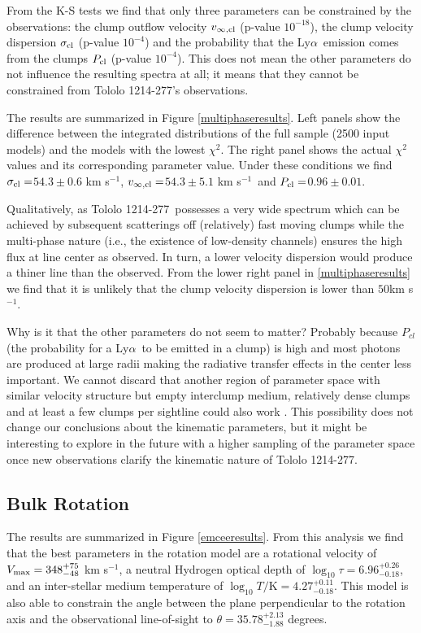 \documentclass[a4,useAMS,usenatbib,usegraphicx]{mn2e}
\newcommand{\tol}{Tololo 1214-277}
\newcommand{\lya}{Ly$\alpha$}
\newcommand{\kms}{km s$^{-1}$}
\newcommand{\sigmaclump}{$54.3\pm 0.6$ km s$^{-1}$}
\newcommand{\inftyclump}{$54.3\pm 5.1$ km s$^{-1}$}
\newcommand{\probaclump}{$0.96\pm 0.01$}
\begin{document}
From the K-S tests we find that only three parameters can be
constrained by the observations: the clump outflow velocity
$v_{\infty,\rm{cl}}$ (p-value  $10^{-18}$), the clump velocity
dispersion $\sigma_{\rm cl}$ (p-value $10^{-4}$) and the probability
that the \lya\ emission comes from the clumps $P_{\rm cl}$ (p-value
$10^{-4}$).
This does not mean the other parameters do not influence the resulting
spectra at all; it means that they cannot be constrained from \tol's
observations.


The results are summarized in Figure \ref{multiphaseresults}.
Left panels show the difference between the integrated distributions
of the full sample (2500 input models) and the models with the lowest
$\chi^2$. 
The right panel shows the actual $\chi^2$ values and its corresponding
parameter value. 
Under these conditions we find $\sigma_{\rm cl}=$\sigmaclump,
$v_{\infty {\rm, cl}}=$\inftyclump\ and $P_{\rm cl}=$\probaclump. 

Qualitatively, as \tol\ possesses a very wide spectrum which can be
achieved by subsequent scatterings off (relatively) fast moving clumps
while the multi-phase nature (i.e., the existence of low-density
channels) ensures the high flux at line center as observed.
In turn, a lower velocity dispersion would produce a thiner line than the
observed.
From the lower right panel in \ref{multiphaseresults} we find that it
is unlikely that the clump velocity dispersion is lower than
$50$\kms. 

Why is it that the other parameters do not seem to matter? Probably
because $P_{cl}$ (the probability for a \lya\ to be emitted in a
clump) is high and most photons are produced at
large radii making the radiative transfer effects in the center less
important.  
We cannot discard that another region of parameter space with similar
velocity structure but empty interclump medium, relatively dense
clumps and at least a few clumps per sightline 
could also work \citep{Hansen06}.
This possibility does not change our conclusions about the
kinematic parameters, but it might be interesting to explore in the
future with a higher sampling of the parameter space once new
observations clarify the kinematic nature of \tol.  

\subsection{Bulk Rotation}


The results are summarized in  Figure \ref{emceeresults}. 
From this analysis we find that the best parameters in the rotation
model are a rotational velocity of  $V_{\rm max}=348^{+75}_{-48}$
\kms, a neutral Hydrogen optical depth of
$\log_{10}\tau=6.96^{+0.26}_{-0.18}$,  and an inter-stellar medium
temperature of $\log_{10} T/\mathrm {K} = 4.27^{+0.11}_{-0.18}$.   
This model is also able to constrain the angle between the plane
perpendicular to the rotation axis and the observational line-of-sight
to $\theta = 35.78^{+2.13}_{-1.88}$ degrees.
\end{document}
